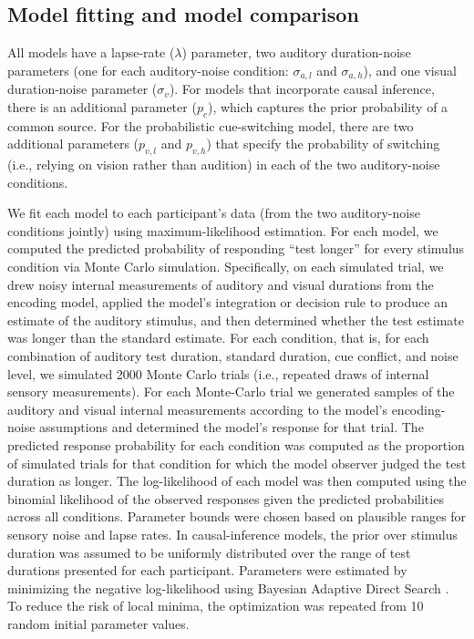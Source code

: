 \documentclass[9pt,lineno,doublespacing]{elife}
\begin{document}
\subsection{Model fitting and model comparison}
All models have a lapse-rate ($\lambda$) parameter, two auditory duration-noise parameters (one for each auditory-noise condition: $\sigma_{a,l}$ and $\sigma_{a,h}$), and one visual duration-noise parameter ($\sigma_{v}$). For models that incorporate causal inference, there is an additional parameter ($p_c$), which captures the prior probability of a common source. For the probabilistic cue-switching model, there are two additional parameters ($p_{v,l}$ and $p_{v,h}$) that specify the probability of switching (i.e., relying on vision rather than audition) in each of the two auditory-noise conditions.

We fit each model to each participant's data (from the two auditory-noise conditions jointly) using maximum-likelihood estimation. For each model, we computed the predicted probability of responding ``test longer'' for every stimulus condition via Monte Carlo simulation. Specifically, on each simulated trial, we drew noisy internal measurements of auditory and visual durations from the encoding model, applied the model's integration or decision rule to produce an estimate of the auditory stimulus, and then determined whether the test estimate was longer than the standard estimate. For each condition, that is, for each combination of auditory test duration, standard duration, cue conflict, and noise level, we simulated 2000 Monte Carlo trials (i.e., repeated draws of internal sensory measurements). For each Monte-Carlo trial we generated samples of the auditory and visual internal measurements according to the model’s encoding-noise assumptions and determined the model's response for that trial. The predicted response probability for each condition was computed as the proportion of simulated trials for that condition for which the model observer judged the test duration as longer. The log-likelihood of each model was then computed using the binomial likelihood of the observed responses given the predicted probabilities across all conditions. Parameter bounds were chosen based on plausible ranges for sensory noise and lapse rates. In causal-inference models, the prior over stimulus duration was assumed to be uniformly distributed over the range of test durations presented for each participant. Parameters were estimated by minimizing the negative log-likelihood using Bayesian Adaptive Direct Search \citep{acerbi2017practical}. To reduce the risk of local minima, the optimization was repeated from 10 random initial parameter values.
\end{document}
